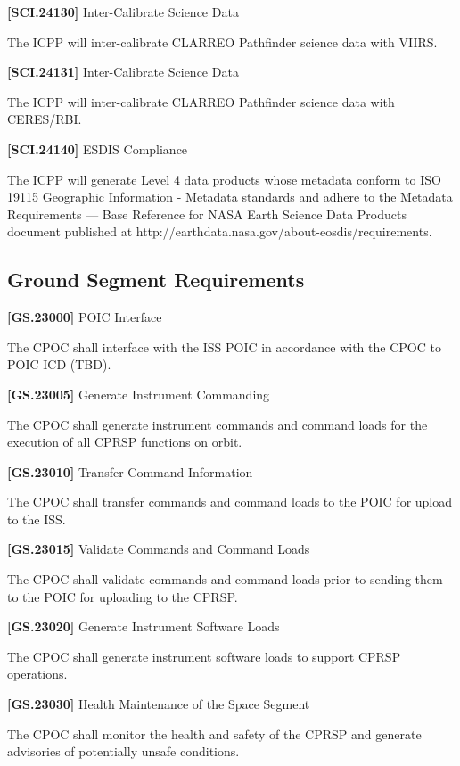 \textbf{[SCI.24130]} Inter-Calibrate Science Data

The \gls{ICPP} will inter-calibrate \gls{CLARREO} Pathfinder science data with \gls{VIIRS}.

\textbf{[SCI.24131]} Inter-Calibrate Science Data

The \gls{ICPP} will inter-calibrate \gls{CLARREO} Pathfinder science data with \gls{CERES}\slash \gls{RBI}.

\textbf{[SCI.24140]} \gls{ESDIS} Compliance

The \gls{ICPP} will generate Level 4 data products whose metadata conform to ISO 19115 Geographic Information - Metadata standards and adhere to the Metadata Requirements --- Base Reference for NASA Earth Science Data Products document published at http:\slash \slash earthdata.nasa.gov\slash about-eosdis\slash requirements.

\subsection{Ground Segment Requirements}
\label{groundsegmentrequirements}

\textbf{[GS.23000]} \gls{POIC} Interface

The \gls{CPOC} shall interface with the \gls{ISS} \gls{POIC} in accordance with the \gls{CPOC} to \gls{POIC} ICD (TBD).

\label{tbx_1}

\textbf{[GS.23005]} Generate Instrument Commanding

The \gls{CPOC} shall generate instrument commands and command loads for the execution of all \gls{CPRSP} functions on orbit.

\textbf{[GS.23010]} Transfer Command Information

The \gls{CPOC} shall transfer commands and command loads to the \gls{POIC} for upload to the \gls{ISS}.

\textbf{[GS.23015]} Validate Commands and Command Loads

The \gls{CPOC} shall validate commands and command loads prior to sending them to the \gls{POIC} for uploading to the \gls{CPRSP}.

\textbf{[GS.23020]} Generate Instrument Software Loads

The \gls{CPOC} shall generate instrument software loads to support \gls{CPRSP} operations.

\textbf{[GS.23030]} Health Maintenance of the Space Segment

The \gls{CPOC} shall monitor the health and safety of the \gls{CPRSP} and generate advisories of potentially unsafe conditions.

